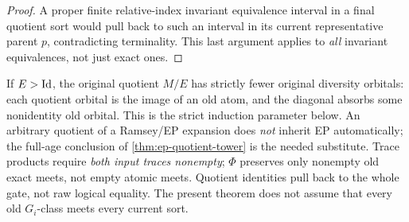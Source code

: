 \begin{proof}
A proper finite relative-index invariant equivalence
interval in a final quotient sort would pull back
to such an interval in its current representative
parent \(p\), contradicting terminality. This last
argument applies to \emph{all} invariant equivalences,
not just exact ones.
\end{proof}

\begin{remark}
\label{rem:ep-trace-audit}
If \(E>\mathrm{Id}\), the original quotient \(M/E\) has strictly
fewer original diversity orbitals: each quotient
orbital is the image of an old atom, and the diagonal
absorbs some nonidentity old orbital. This is the
strict induction parameter below. An arbitrary
quotient of a Ramsey/EP expansion does \emph{not}
inherit EP automatically; the full-age conclusion
of \cref{thm:ep-quotient-tower} is the needed substitute.
Trace products require \emph{both input traces
nonempty}; \(\Phi\) preserves only nonempty old
exact meets, not empty atomic meets.  Quotient
identities pull back to the whole gate, not raw
logical equality. The present theorem does not
assume that every old \(G_i\)-class meets every
current sort.
\end{remark}
